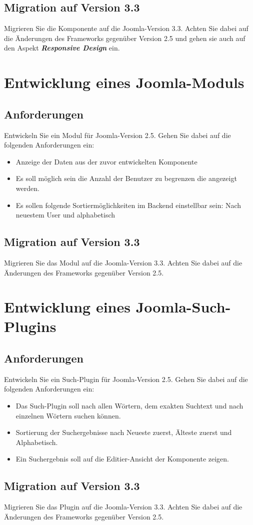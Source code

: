 \documentclass[]{article}
\begin{document}
\subsection{Migration auf Version 3.3}
Migrieren Sie die Komponente auf die Joomla-Version 3.3. Achten Sie dabei auf die Änderungen des Frameworks gegenüber Version 2.5 und gehen sie auch auf den Aspekt \textit{\textbf{Responsive Design}} ein.
\section{Entwicklung eines Joomla-Moduls}
\subsection{Anforderungen}
Entwickeln Sie ein Modul für Joomla-Version 2.5. Gehen Sie dabei auf die folgenden Anforderungen ein:
\begin{itemize}
\item Anzeige der Daten aus der zuvor entwickelten Komponente
\item Es soll möglich sein die Anzahl der Benutzer zu begrenzen die angezeigt werden.
\item Es sollen folgende Sortiermöglichkeiten im Backend einstellbar sein: Nach neuestem User und alphabetisch
\end{itemize}
\subsection{Migration auf Version 3.3}
Migrieren Sie das Modul auf die Joomla-Version 3.3. Achten Sie dabei auf die Änderungen des Frameworks gegenüber Version 2.5.
\section{Entwicklung eines Joomla-Such-Plugins}
\subsection{Anforderungen}
Entwickeln Sie ein Such-Plugin für Joomla-Version 2.5. Gehen Sie dabei auf die folgenden Anforderungen ein:
\begin{itemize}
\item Das Such-Plugin soll nach allen Wörtern, dem exakten Suchtext und nach einzelnen Wörtern suchen können.
\item Sortierung der Suchergebnisse nach Neueste zuerst, Älteste zuerst und Alphabetisch.
\item Ein Suchergebnis soll auf die Editier-Ansicht der Komponente zeigen.
\end{itemize}
\subsection{Migration auf Version 3.3}
Migrieren Sie das Plugin auf die Joomla-Version 3.3. Achten Sie dabei auf die Änderungen des Frameworks gegenüber Version 2.5.
\end{document}
